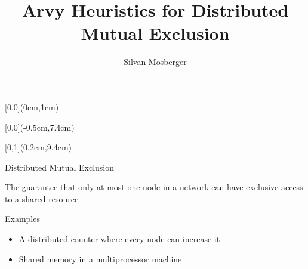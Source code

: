 \documentclass[12pt,hyperref={pdfpagelabels=false},usenames,dvipsnames]{beamer}
\title{Arvy Heuristics for Distributed Mutual Exclusion}
\author{Silvan Mosberger}
\institute{ETH Zurich -- Distributed Computing Group -- www.disco.ethz.ch}
\begin{document}
{
\begin{frame}
\begin{textblock*}{\paperwidth}[0,0](0cm,1cm)
        \begin{center}
                \textbf{\huge \inserttitle}
        \end{center}
\end{textblock*}
\begin{textblock*}{\paperwidth}[0,0](-0.5cm,7.4cm)
        \flushright
        \color{white}
        \itshape \insertauthor
\end{textblock*}
\begin{textblock*}{\paperwidth}[0,1](0.2cm,9.4cm)
        \flushleft
        \tiny \itshape \insertinstitute
\end{textblock*}
\end{frame}
}


\begin{frame}{Distributed Mutual Exclusion}

The guarantee that only at most one node in a network can have exclusive access to a shared resource

\begin{block}{Examples}
\begin{itemize}
\item A distributed counter where every node can increase it
\item Shared memory in a multiprocessor machine
\end{itemize}

\end{block}

\end{frame}
\end{document}
